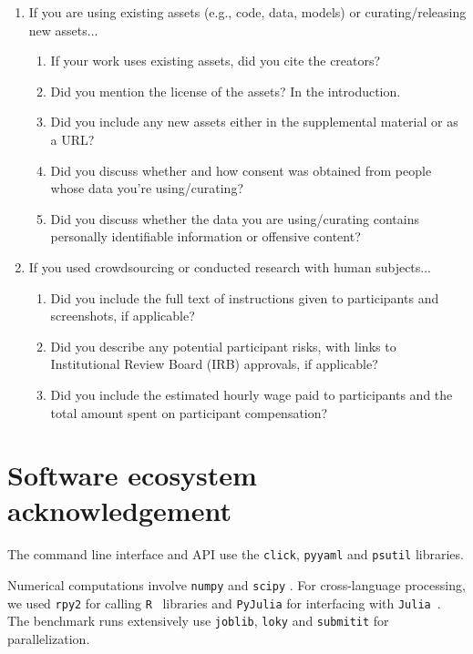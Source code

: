 \documentclass{article}
\begin{document}
\begin{enumerate}
\item If you are using existing assets (e.g., code, data, models) or curating/releasing new assets...
\begin{enumerate}
  \item If your work uses existing assets, did you cite the creators?
    \answerYes{}
  \item Did you mention the license of the assets?
    \answerYes{} In the introduction.
  \item Did you include any new assets either in the supplemental material or as a URL?
    \answerYes{}
  \item Did you discuss whether and how consent was obtained from people whose data you're using/curating?
    \answerNA{}
  \item Did you discuss whether the data you are using/curating contains personally identifiable information or offensive content?
    \answerNA{}
\end{enumerate}

\item If you used crowdsourcing or conducted research with human subjects...
\begin{enumerate}
  \item Did you include the full text of instructions given to participants and screenshots, if applicable?
    \answerNA{}
  \item Did you describe any potential participant risks, with links to Institutional Review Board (IRB) approvals, if applicable?
    \answerNA{}
  \item Did you include the estimated hourly wage paid to participants and the total amount spent on participant compensation?
    \answerNA{}
\end{enumerate}

\end{enumerate}

\newpage
\appendix
\def\thetable{\thesection.\arabic{table}}

\clearpage{}\section{Software ecosystem acknowledgement}
\label{sec:app:software}

The command line interface and API use the \texttt{click}, \texttt{pyyaml} and \texttt{psutil} \citep{psutil} libraries.

Numerical computations involve \texttt{numpy} \citep{harris2020array} and \texttt{scipy} \citep{2020SciPy-NMeth}.
For cross-language processing, we used \texttt{rpy2} for calling \texttt{R}~\citep{Rlang} libraries and \texttt{PyJulia} for interfacing with \texttt{Julia}~\citep{Julia}.
The benchmark runs extensively use \texttt{joblib}, \texttt{loky} \citep{loky} and \texttt{submitit} for parallelization.
\end{document}
